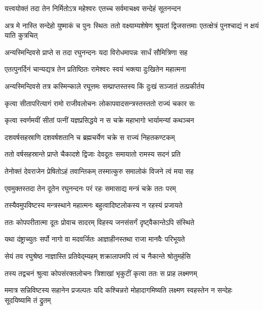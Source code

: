 \twolineshloka
{यत्त्वयोक्तं तदा तेन निर्मितोऽत्र महेश्वरः}
{एतच्च सर्वमाचक्ष्व सन्देहं सूतनन्दन}%



\threelineshloka
{अत्र मे नास्ति सन्देहो युष्माकं च पुनः स्थितः}
{ततो वक्ष्याम्यशेषेण श्रूयतां द्विजसत्तमाः}
{एतत्क्षेत्रं पुनश्चाद्यं न क्षयं याति कुत्रचित्}%

\twolineshloka
{अन्यस्मिन्दिवसे प्राप्ते स तदा रघुनन्दनः}
{यदा विरोधमापन्नः सार्धं सौमित्रिणा सह}%

\twolineshloka
{एतत्पुनर्दिनं चान्यद्यत्र तेन प्रतिष्ठितः}
{रामेश्वरः स्वयं भक्त्या दुःखितेन महात्मना}%


\twolineshloka
{अन्यस्मिन्दिवसे तत्र कस्मिन्काले रघूत्तमः}
{सम्प्राप्तस्तस्य किं दुःखं सञ्जातं तत्प्रकीर्तय}%


\twolineshloka
{कृत्वा सीतापरित्यागं रामो राजीवलोचनः}
{लोकापवादसन्त्रस्तस्ततो राज्यं चकार सः}%

\twolineshloka
{कृत्वा स्वर्णमयीं सीतां पत्नीं यज्ञप्रसिद्धये}
{न स चक्रे महाभागो भार्यामन्यां कथञ्चन}%

\twolineshloka
{दशवर्षसहस्राणि दशवर्षशतानि च}
{ब्रह्मचर्येण चक्रे स राज्यं निहतकण्टकम्}%

\twolineshloka
{ततो वर्षसहस्रान्ते प्राप्ते चैकादशे द्विजाः}
{देवदूतः समायातो रामस्य सदनं प्रति}%

\twolineshloka
{तेनोक्तं देवराजेन प्रेषितोऽहं तवान्तिकम्}
{तस्मात्कुरु समालोकं विजने त्वं मया सह}%

\twolineshloka
{एवमुक्तस्तदा तेन दूतेन रघुनन्दनः}
{परं रहः समासाद्य मन्त्रं चक्रे ततः परम्}%

\twolineshloka
{तस्यैवमुपविष्टस्य मन्त्रस्थाने महात्मनः}
{बहुत्वादिष्टलोकस्य न रहस्यं प्रजायते}%

\twolineshloka
{ततः कोपपरीतात्मा दूतः प्रोवाच सादरम्}
{विहस्य जनसंसर्गं दृष्ट्वैकान्तेऽपि संस्थिते}%

\twolineshloka
{यथा दंष्ट्राच्युतः सर्पो नागो वा मदवर्जितः}
{आज्ञाहीनस्तथा राजा मानवैः परिभूयते}%

\twolineshloka
{सेयं तव रघुश्रेष्ठ नाज्ञास्ति प्रतिवेद्म्यहम्}
{शक्रालापमपि त्वं च नैकान्ते श्रोतुमर्हसि}%

\twolineshloka
{तस्य तद्वचनं श्रुत्वा कोपसंरक्तलोचनः}
{त्रिशाखां भृकुटीं कृत्वा ततः स प्राह लक्ष्मणम्}%

\threelineshloka
{ममात्र सन्निविष्टस्य सहानेन प्रजल्पतः}
{यदि कश्चिन्नरो मोहादागमिष्यति लक्ष्मण}
{स्वहस्तेन न सन्देहः सूदयिष्यामि तं द्रुतम्}%

